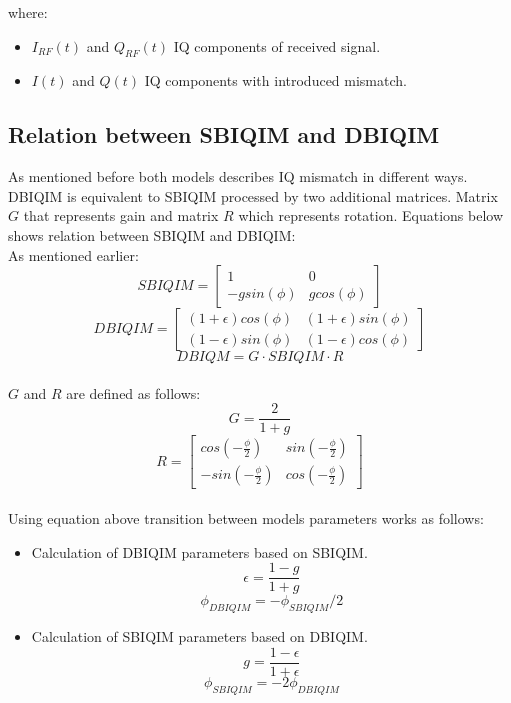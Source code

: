 \documentclass[en,printmode]{mgr}
\begin{document}
		where:
		\begin{itemize}
			\item $I_{RF}(t)$ and $Q_{RF}(t)$ IQ components of received signal.
			\item $I(t)$ and $Q(t)$ IQ components with introduced mismatch.
		\end{itemize}
		\newpage
		\subsection*{Relation between SBIQIM and DBIQIM}
			As mentioned before both models describes IQ mismatch in different ways. DBIQIM is
			equivalent to SBIQIM processed by two additional matrices. Matrix $G$ that represents gain
			and matrix $R$ which represents rotation.
			Equations below shows relation between SBIQIM and DBIQIM:
			\\
			
			
			As mentioned earlier:
			\[
				SBIQIM = 
				\begin{bmatrix}
				1 & 0 \\
				-g sin(\phi) & g cos(\phi)
				\end{bmatrix}
			\]
			\[
				DBIQIM = 
				\begin{bmatrix}
					(1 + \epsilon) cos(\phi) & (1 + \epsilon) sin(\phi) \\
					(1 - \epsilon) sin(\phi) & (1 - \epsilon) cos(\phi)
				\end{bmatrix}
			\]
			\vspace{0.5cm}
			\begin{equation}
				DBIQM = G\cdot SBIQIM \cdot R
			\end{equation}
			\\
			
			
			$G$ and $R$ are defined as follows:
			\begin{equation}
				G = \frac{2}{1+g}
			\end{equation}
			\begin{equation}
				R = 
				\begin{bmatrix}
					cos(-\frac{\phi}{2}) & sin(-\frac{\phi}{2}) \\
				   -sin(-\frac{\phi}{2}) & cos(-\frac{\phi}{2})
				\end{bmatrix}
			\end{equation}
			\\
			
			
			Using equation above transition between models parameters works as follows:
			\begin{itemize}
				\item Calculation of DBIQIM parameters based on SBIQIM.
				\[
					\epsilon = \frac{1-g}{1+g}
				\]
				\[
					\phi_{DBIQIM} = - \phi_{SBIQIM}/2
				\]
				\item Calculation of SBIQIM parameters based on DBIQIM.
				\[
					g = \frac{1-\epsilon}{1+\epsilon}
				\]
				\[
					\phi_{SBIQIM} = - 2\phi_{DBIQIM}
				\]
			\end{itemize}
			
\end{document}
